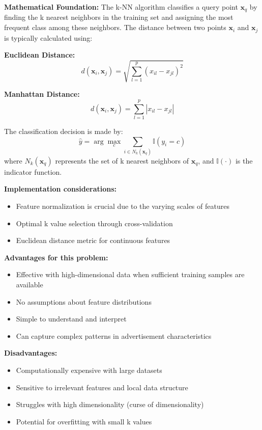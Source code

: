 \textbf{Mathematical Foundation:}
The k-NN algorithm classifies a query point $\mathbf{x}_q$ by finding the k nearest neighbors in the training set and assigning the most frequent class among these neighbors. The distance between two points $\mathbf{x}_i$ and $\mathbf{x}_j$ is typically calculated using:

\textbf{Euclidean Distance:}
\begin{equation}
d(\mathbf{x}_i, \mathbf{x}_j) = \sqrt{\sum_{l=1}^{p} (x_{il} - x_{jl})^2}
\end{equation}

\textbf{Manhattan Distance:}
\begin{equation}
d(\mathbf{x}_i, \mathbf{x}_j) = \sum_{l=1}^{p} |x_{il} - x_{jl}|
\end{equation}

The classification decision is made by:
\begin{equation}
\hat{y} = \arg\max_{c} \sum_{i \in N_k(\mathbf{x}_q)} \mathbb{I}(y_i = c)
\end{equation}
where $N_k(\mathbf{x}_q)$ represents the set of k nearest neighbors of $\mathbf{x}_q$, and $\mathbb{I}(\cdot)$ is the indicator function.

\textbf{Implementation considerations:}
\begin{itemize}
    \item Feature normalization is crucial due to the varying scales of features
    \item Optimal k value selection through cross-validation
    \item Euclidean distance metric for continuous features
\end{itemize}

\textbf{Advantages for this problem:}
\begin{itemize}
    \item Effective with high-dimensional data when sufficient training samples are available
    \item No assumptions about feature distributions
    \item Simple to understand and interpret
    \item Can capture complex patterns in advertisement characteristics
\end{itemize}

\textbf{Disadvantages:}
\begin{itemize}
    \item Computationally expensive with large datasets
    \item Sensitive to irrelevant features and local data structure
    \item Struggles with high dimensionality (curse of dimensionality)
    \item Potential for overfitting with small k values
\end{itemize}

